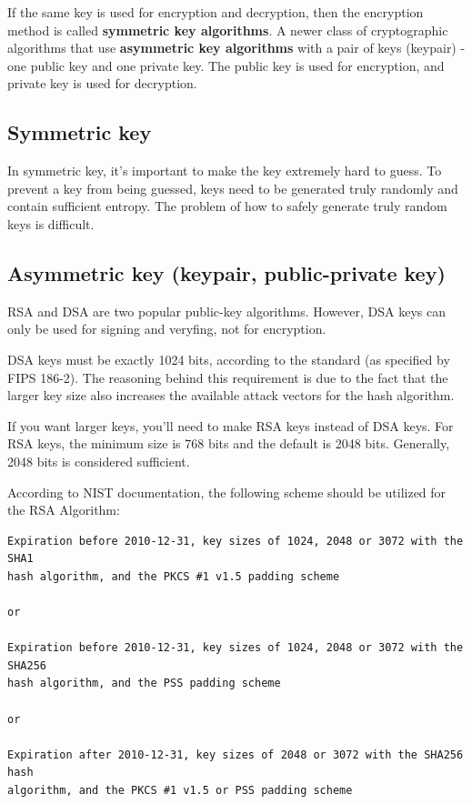 If the same key is used for encryption and decryption, then the encryption
method is called {\bf symmetric key algorithms}. A newer class of cryptographic
algorithms that use {\bf asymmetric key algorithms} with a pair of keys
(keypair) - one public key and one private key. The public key is used for
encryption, and private key is used for decryption. 

\subsection{Symmetric key}
\label{sec:symmetric_encryption}

In symmetric key, it's important to make the key extremely hard to guess.
To prevent a key from being guessed, keys need to be generated truly randomly
and contain sufficient entropy. 
The problem of how to safely generate truly random keys is difficult.



\subsection{Asymmetric key (keypair, public-private key)}
\label{sec:asymmetric_encryption}

RSA and DSA are two popular public-key algorithms. However, DSA keys can only be
used for signing and veryfing, not for encryption. 

DSA keys must be exactly 1024 bits, according to the standard (as specified by
FIPS 186-2). The reasoning behind this requirement is due to the fact that the
larger key size also increases the available attack vectors for the hash algorithm.

If you want larger keys, you'll need to make RSA keys instead of
DSA keys. For RSA keys, the minimum size is 768 bits and the default is 2048 
bits. Generally, 2048 bits is considered sufficient. 

According to NIST documentation, the following 
scheme should be utilized for the RSA Algorithm:
\begin{verbatim}
Expiration before 2010-12-31, key sizes of 1024, 2048 or 3072 with the SHA1 
hash algorithm, and the PKCS #1 v1.5 padding scheme 

or 

Expiration before 2010-12-31, key sizes of 1024, 2048 or 3072 with the SHA256 
hash algorithm, and the PSS padding scheme 

or 

Expiration after 2010-12-31, key sizes of 2048 or 3072 with the SHA256 hash 
algorithm, and the PKCS #1 v1.5 or PSS padding scheme 
\end{verbatim}


